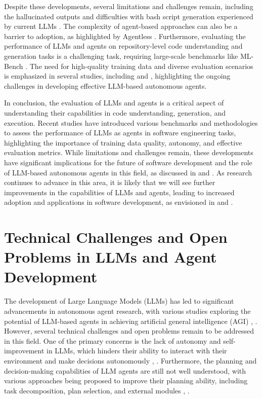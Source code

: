 \documentclass[conference]{IEEEtran}
\begin{document}
Despite these developments, several limitations and challenges remain, including the hallucinated outputs and difficulties with bash script generation experienced by current LLMs \cite{2308.03688}. The complexity of agent-based approaches can also be a barrier to adoption, as highlighted by Agentless \cite{2407.01489}. Furthermore, evaluating the performance of LLMs and agents on repository-level code understanding and generation tasks is a challenging task, requiring large-scale benchmarks like ML-Bench \cite{2311.09835}. The need for high-quality training data and diverse evaluation scenarios is emphasized in several studies, including \cite{2308.03688} and \cite{2311.09835}, highlighting the ongoing challenges in developing effective LLM-based autonomous agents.

In conclusion, the evaluation of LLMs and agents is a critical aspect of understanding their capabilities in code understanding, generation, and execution. Recent studies have introduced various benchmarks and methodologies to assess the performance of LLMs as agents in software engineering tasks, highlighting the importance of training data quality, autonomy, and effective evaluation metrics. While limitations and challenges remain, these developments have significant implications for the future of software development and the role of LLM-based autonomous agents in this field, as discussed in \cite{2410.07331} and \cite{2402.16499}. As research continues to advance in this area, it is likely that we will see further improvements in the capabilities of LLMs and agents, leading to increased adoption and applications in software development, as envisioned in \cite{2308.03688} and \cite{2311.09835}.

\section{Technical Challenges and Open Problems in LLMs and Agent Development}
The development of Large Language Models (LLMs) has led to significant advancements in autonomous agent research, with various studies exploring the potential of LLM-based agents in achieving artificial general intelligence (AGI) \cite{2402.02716}, \cite{2308.11432}. However, several technical challenges and open problems remain to be addressed in this field. One of the primary concerns is the lack of autonomy and self-improvement in LLMs, which hinders their ability to interact with their environment and make decisions autonomously \cite{2409.14457}, \cite{2411.14033}. Furthermore, the planning and decision-making capabilities of LLM agents are still not well understood, with various approaches being proposed to improve their planning ability, including task decomposition, plan selection, and external modules \cite{2402.02716}, \cite{2407.01489}.
\end{document}
